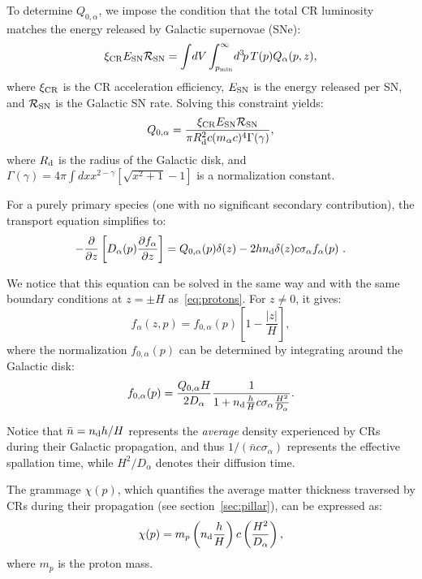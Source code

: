 To determine \(Q_{0,\alpha}\), we impose the condition that the total CR luminosity matches the energy released by Galactic supernovae (SNe):  
\begin{equation}
\xi_{\rm CR} E_{\rm SN} \mathcal{R}_{\rm SN} = \int \! dV \int_{p_{\rm min}}^\infty \! d^3 \! p \, T(p) Q_\alpha(p, z),
\end{equation}
where \(\xi_{\rm CR}\) is the CR acceleration efficiency, \(E_{\rm SN}\) is the energy released per SN, and \(\mathcal{R}_{\rm SN}\) is the Galactic SN rate. Solving this constraint yields:  
\begin{equation}
Q_{0,\alpha} = \frac{\xi_{\rm CR} E_{\rm SN} \mathcal{R}_{\rm SN}}{\pi R_{\rm d}^2 c (m_\alpha c)^4 \Gamma(\gamma)},
\end{equation}
where \(R_{\rm d}\) is the radius of the Galactic disk, and \(\Gamma(\gamma) = 4\pi \int dx x^{2-\gamma} \left[ \sqrt{x^2 + 1} - 1 \right] \) is a normalization constant.

For a purely primary species (one with no significant secondary contribution), the transport equation simplifies to:  
\begin{equation}
-\frac{\partial}{\partial z} \left[ D_\alpha(p) \frac{\partial f_\alpha}{\partial z} \right] = Q_{0,\alpha}(p)\delta(z) - 2 h n_{\rm d} \delta (z) c \sigma_\alpha f_\alpha(p)~.
\end{equation}

We notice that this equation can be solved in the same way and with the same boundary conditions at $z = \pm H$ as~\cref{eq:protons}. 
%
For $z \neq 0$, it gives:
\begin{equation}
f_\alpha(z, p) = f_{0,\alpha}(p) \left[ 1 - \frac{|z|}{H} \right],
\end{equation}
where the normalization \(f_{0,\alpha}(p)\) can be determined by integrating around the Galactic disk:  
\begin{equation}
f_{0,\alpha}(p) = \frac{Q_{0,\alpha} H}{2D_\alpha} \frac{1}{1 + n_{\rm d} \frac{h}{H} c \sigma_\alpha \frac{H^2}{D_\alpha}}.
\end{equation}

Notice that $\bar n = n_{\rm d} h/H$ represents the \emph{average} density experienced by CRs during their Galactic propagation, and thus $1/(\bar n c \sigma_\alpha)$ represents the effective spallation time, while $H^2/D_\alpha$ denotes their diffusion time.

The grammage \(\chi(p)\), which quantifies the average matter thickness traversed by CRs during their propagation (see section~\ref{sec:pillar}), can be expressed as:  
\begin{equation}\label{eq:grammage}
\chi(p) = m_p \left( n_{\rm d} \frac{h}{H} \right) c \left( \frac{H^2}{D_\alpha} \right),
\end{equation}
where \(m_p\) is the proton mass. 

